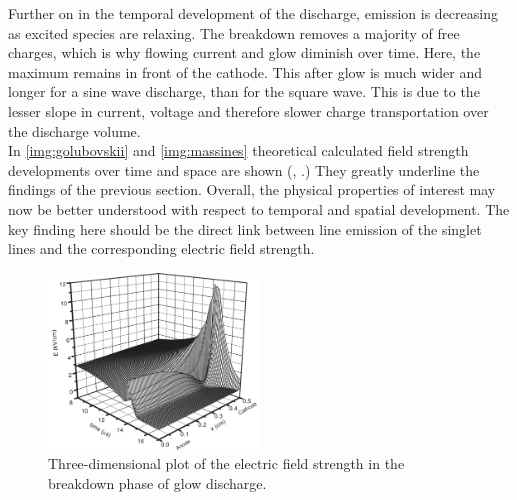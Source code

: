 \documentclass[a4paper,10pt,twoside]{article}
\begin{document}
		Further on in the temporal development of the discharge, emission is decreasing as excited species are relaxing. The breakdown removes a majority of free charges, which is why flowing current and glow diminish over time. Here, the maximum remains in front of the cathode. This after glow is much wider and longer for a sine wave discharge, than for the square wave. This is due to the lesser slope in current, voltage and therefore slower charge transportation over the discharge volume.\\
		In \autoref{img:golubovskii} and \autoref{img:massines} theoretical calculated field strength developments over time and space are shown (\cite{Massines}, \cite{0022-3727-36-1-306}.) They greatly underline the findings of the previous section. Overall, the physical properties of interest may now be better understood with respect to temporal and spatial development. The key finding here should be the direct link between line emission of the singlet lines and the corresponding electric field strength.
		
			\begin{figure}
				\centering
				\includegraphics[width=0.5\textwidth]{figures/lineratio/golubovskiip47fig9}
				\caption{Three-dimensional plot of the electric field strength in the breakdown phase of glow discharge. \cite{0022-3727-36-1-306}}
				\label{img:golubovskii}
			\end{figure}
		
			\onecolumn
			
\end{document}
